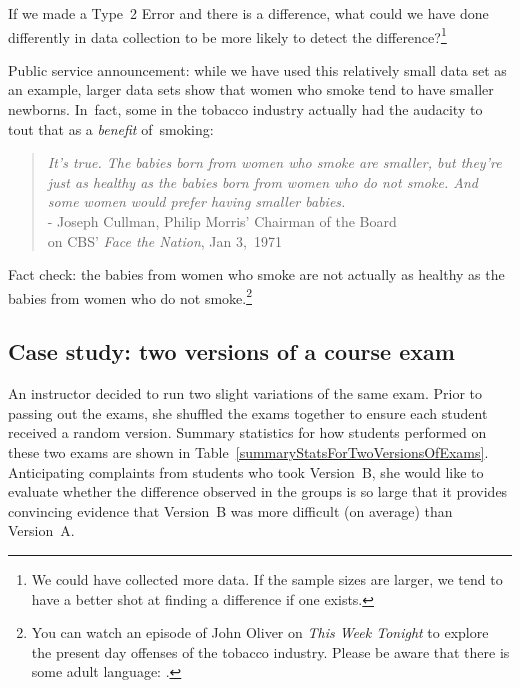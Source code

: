 {\begin{exercise} \label{babySmokeHTIDingHowToDetectDifferences}
If we made a Type~2 Error and there is a difference, what could we have done differently in data collection to be more likely to detect the difference?\footnote{We could have collected more data. If the sample sizes are larger, we tend to have a better shot at finding a difference if one exists.}
\end{exercise}

Public service announcement: while we have used this relatively small data set as an example, larger data sets show that women who smoke tend to have smaller newborns. In~fact, some in the tobacco industry actually had the audacity to tout that as a \emph{benefit} of~smoking:
\begin{quotation}
\noindent\emph{It's true. The babies born from women who smoke are smaller, but they're just as healthy as the babies born from women who do not smoke. And some women would prefer having smaller babies.} \\[2mm]
\indent\indent\indent\indent\indent\indent- Joseph Cullman, Philip Morris' Chairman of the Board \\
\indent\indent\indent\indent\indent{}on CBS' \emph{Face the Nation}, Jan 3,~1971
\end{quotation}
Fact check: the babies from women who smoke are not actually as healthy as the babies from women who do not smoke.\footnote{You can watch an episode of John Oliver on \emph{This Week Tonight} to explore the present day offenses of the tobacco industry. Please be aware that there is some adult language: .}



\subsection{Case study: two versions of a course exam}


An instructor decided to run two slight variations of the same exam. Prior to passing out the exams, she shuffled the exams together to ensure each student received a random version. Summary statistics for how students performed on these two exams are shown in Table~\ref{summaryStatsForTwoVersionsOfExams}. Anticipating complaints from students who took Version~B, she would like to evaluate whether the difference observed in the groups is so large that it provides convincing evidence that Version~B was more difficult (on average) than Version~A.

}
